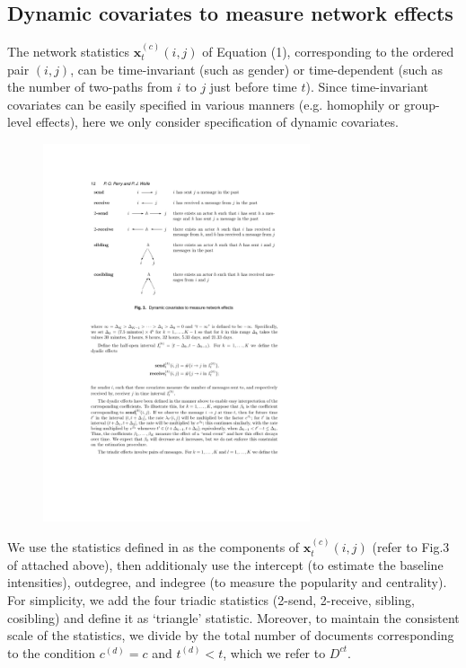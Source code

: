 \documentclass[a4paper]{article}
\begin{document}
 \subsection{Dynamic covariates to measure network effects}
 The network statistics $\boldsymbol{x}^{(c)}_t(i, j)$ of Equation (1), corresponding to the ordered pair $(i, j)$, can be time-invariant (such as gender) or time-dependent (such as the number of two-paths from $i$ to $j$ just before time $t$). Since time-invariant covariates can be easily specified in various manners (e.g. homophily or group-level effects), here we only consider specification of dynamic covariates.
 \begin{figure}[ht]
 	\centering
 	\includegraphics[width=0.7\textwidth]{PerryWolfe.pdf} 
 	\label{fig:PerryWolfeplot}
 \end{figure}
 \newline We use the statistics defined in \cite{PerryWolfe2012} as the components of $\boldsymbol{x}^{(c)}_t(i, j)$ (refer to Fig.3 of \cite{PerryWolfe2012} attached above), then additionaly use the intercept (to estimate the baseline intensities), outdegree, and indegree (to measure the popularity and centrality). For simplicity, we add the four triadic statistics (2-send, 2-receive, sibling, cosibling) and define it as `triangle' statistic. Moreover, to maintain the consistent scale of the statistics, we divide by the total number of documents corresponding to the condition $c^{(d)}=c$ and $t^{(d)}<t$, which we refer to $D^{ct}$.
\end{document}
